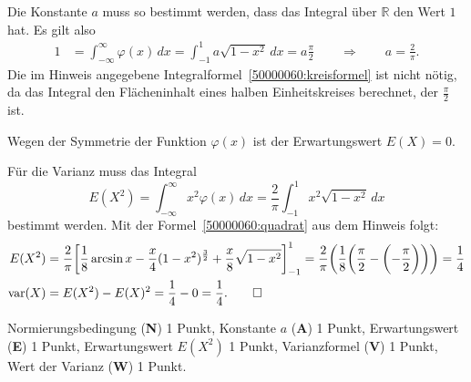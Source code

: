 \begin{loesung}
\begin{teilaufgaben}
\item
Die Konstante $a$ muss so bestimmt werden, dass das Integral über $\mathbb{R}$
den Wert $1$ hat.
Es gilt also
\begin{align*}
1
&=
\int_{-\infty}^{\infty}
\varphi(x)
\,dx
=
\int_{-1}^1
a\sqrt{1-x^2}
\,dx
=
a\frac{\pi}{2}
\qquad\Rightarrow\qquad
a=\frac{2}{\pi}.
\end{align*}
Die im Hinweis angegebene Integralformel~\eqref{50000060:kreisformel}
ist nicht nötig, da das Integral den Flächeninhalt eines halben
Einheitskreises berechnet, der $\frac{\pi}2$ ist.
\item
Wegen der Symmetrie der Funktion $\varphi(x)$ ist der Erwartungswert
$E(X)=0$.
\item 
Für die Varianz muss das Integral
\[
E(X^2)
=
\int_{-\infty}^\infty x^2\varphi(x)\,dx
=
\frac{2}{\pi}\int_{-1}^1 x^2\sqrt{1-x^2}\,dx
\]
bestimmt werden.
Mit der Formel~\eqref{50000060:quadrat} aus dem Hinweis folgt:
\begin{align*}
E(X^2)
&=
\frac{2}{\pi}
\biggl[
\frac18\arcsin x - \frac{x}4(1-x^2)^{\frac32}+\frac{x}8\sqrt{1-x^2}
\bigg]_{-1}^1
=
\frac{2}{\pi}\biggl(
\frac18\biggl(\frac{\pi}{2}-\biggl(-\frac{\pi}2\biggr)\biggr)
\biggr)
=
\frac{1}{4}
\\
\operatorname{var}(X)
&=
E(X^2)-E(X)^2
=
\frac{1}{4}-0
=
\frac{1}{4}.
\qedhere
\end{align*}
\end{teilaufgaben}
\end{loesung}

\begin{bewertung}
Normierungsbedingung ({\bf N}) 1 Punkt,
Konstante $a$ ({\bf A}) 1 Punkt,
Erwartungswert ({\bf E}) 1 Punkt,
Erwartungswert $E(X^2)$ 1 Punkt,
Varianzformel ({\bf V}) 1 Punkt,
Wert der Varianz ({\bf W}) 1 Punkt.
\end{bewertung}
